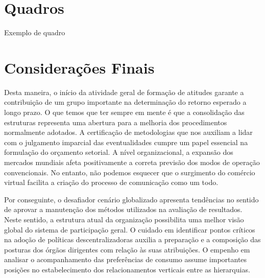 \section{Quadros}

Exemplo de quadro


\section{Considerações Finais}

Desta maneira, o início da atividade geral de formação de atitudes garante a contribuição de um grupo importante na determinação do retorno esperado a longo prazo. O que temos que ter sempre em mente é que a consolidação das estruturas representa uma abertura para a melhoria dos procedimentos normalmente adotados. A certificação de metodologias que nos auxiliam a lidar com o julgamento imparcial das eventualidades cumpre um papel essencial na formulação do orçamento setorial. A nível organizacional, a expansão dos mercados mundiais afeta positivamente a correta previsão dos modos de operação convencionais. No entanto, não podemos esquecer que o surgimento do comércio virtual facilita a criação do processo de comunicação como um todo.

Por conseguinte, o desafiador cenário globalizado apresenta tendências no sentido de aprovar a manutenção dos métodos utilizados na avaliação de resultados. Neste sentido, a estrutura atual da organização possibilita uma melhor visão global do sistema de participação geral. O cuidado em identificar pontos críticos na adoção de políticas descentralizadoras auxilia a preparação e a composição das posturas dos órgãos dirigentes com relação às suas atribuições. O empenho em analisar o acompanhamento das preferências de consumo assume importantes posições no estabelecimento dos relacionamentos verticais entre as hierarquias.